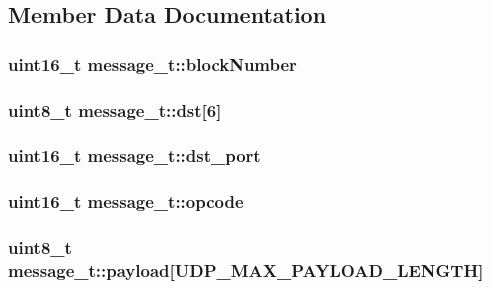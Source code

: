 \subsection{\-Member \-Data \-Documentation}
\hypertarget{structmessage__t_ab2e0dd1f90b17e739a3ddbb7b2676318}{
\subsubsection[{block\-Number}]{\setlength{\rightskip}{0pt plus 5cm}uint16\-\_\-t {\bf message\-\_\-t\-::block\-Number}}}\label{structmessage__t_ab2e0dd1f90b17e739a3ddbb7b2676318}
\hypertarget{structmessage__t_a1e6460e4025568b22c19e9fa4635ff9f}{
\subsubsection[{dst}]{\setlength{\rightskip}{0pt plus 5cm}uint8\-\_\-t {\bf message\-\_\-t\-::dst}\mbox{[}6\mbox{]}}}\label{structmessage__t_a1e6460e4025568b22c19e9fa4635ff9f}
\hypertarget{structmessage__t_ac1b5eec32a146d37d429552a7f3f7775}{
\subsubsection[{dst\-\_\-port}]{\setlength{\rightskip}{0pt plus 5cm}uint16\-\_\-t {\bf message\-\_\-t\-::dst\-\_\-port}}}\label{structmessage__t_ac1b5eec32a146d37d429552a7f3f7775}
\hypertarget{structmessage__t_ae51f52a1afc73e1479579e83a7ca3728}{
\subsubsection[{opcode}]{\setlength{\rightskip}{0pt plus 5cm}uint16\-\_\-t {\bf message\-\_\-t\-::opcode}}}\label{structmessage__t_ae51f52a1afc73e1479579e83a7ca3728}
\hypertarget{structmessage__t_a6ad8b21c0bc600519e376f7832e538af}{
\subsubsection[{payload}]{\setlength{\rightskip}{0pt plus 5cm}uint8\-\_\-t {\bf message\-\_\-t\-::payload}\mbox{[}{\bf \-U\-D\-P\-\_\-\-M\-A\-X\-\_\-\-P\-A\-Y\-L\-O\-A\-D\-\_\-\-L\-E\-N\-G\-T\-H}\mbox{]}}}\label{structmessage__t_a6ad8b21c0bc600519e376f7832e538af}
